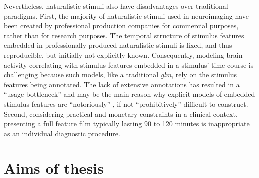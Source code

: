 Nevertheless, naturalistic stimuli also have disadvantages over traditional
paradigms.
First, the majority of naturalistic stimuli used in neuroimaging have been
created by professional production companies for commercial purposes, rather
than for research purposes.
The temporal structure of stimulus features embedded in professionally produced
naturalistic stimuli is fixed, and thus reproducible, but initially not
explicitly known.
Consequently, modeling brain activity correlating with stimulus features
embedded in a stimulus' time course is challenging
\citep{saarimaki2021naturalistic, simony2020analysis} because such models, like
a traditional \textit{\ac{glm}}, rely on the stimulus features being annotated.
The lack of extensive annotations has resulted in a ``usage bottleneck''
\citep[][p.  16]{aliko2020naturalistic} and may be the main reason why explicit
models of embedded stimulus features are ``notoriously'' \citep[][p.
1]{richard2019fast}, if not ``prohibitively'' \citep[p.
676]{nastase2019measuring} difficult to construct.
Second, considering practical and monetary constraints in a clinical context,
presenting a full feature film typically lasting 90 to 120 minutes is
inappropriate as an individual diagnostic procedure.





\section{Aims of thesis}


